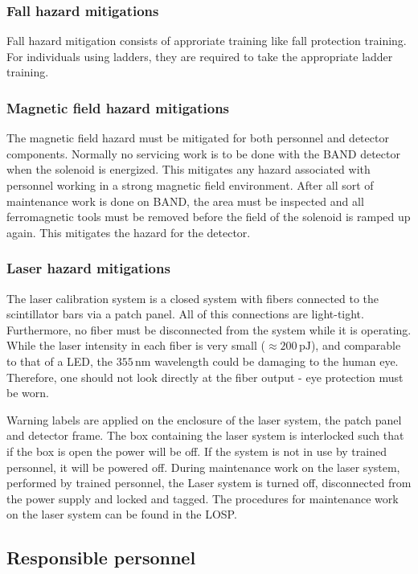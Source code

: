\subsubsection{Fall hazard mitigations} 
Fall hazard mitigation consists of approriate training like fall protection training.  For individuals using ladders,  they are required to take the appropriate ladder training.

\subsubsection{Magnetic field hazard mitigations}
The magnetic field hazard must be mitigated for both personnel and detector components.  Normally no servicing work is to be done with the BAND detector when the solenoid is energized.
This mitigates any hazard associated with personnel working in a strong magnetic field environment. 
After all sort of maintenance work is done on BAND,  the area must be inspected and all ferromagnetic tools must be removed before the field of the solenoid is ramped up again.  This mitigates the hazard for the detector. 
\subsubsection{Laser hazard mitigations}
The laser calibration system is a closed system with fibers connected to the scintillator bars via a patch panel.  All of this connections are light-tight.  Furthermore,  no fiber must be disconnected from the system while it is operating.  While the laser intensity in each fiber is very small ($\approx 200\,\mathrm{pJ}$),  and comparable to that of a LED,  the $355\,\mathrm{nm}$ wavelength could be damaging to the human eye.  Therefore,  one should not look directly at the fiber output - eye protection must be worn. 

Warning labels are applied on the enclosure of the laser system,  the patch panel and detector frame.  The box containing the laser system is interlocked such that if the box is open the power will be off.  If the system is not in use by trained personnel,  it will be powered off.  During maintenance work on the laser system,  performed by trained personnel,  the Laser system is turned off,  disconnected from the power supply and locked and tagged.  The procedures for maintenance work on the laser system can be found in the LOSP.


\subsection{Responsible personnel}
\indent

